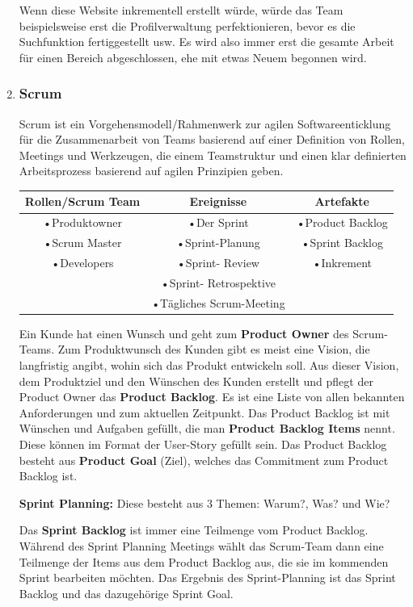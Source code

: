 \documentclass{article}
\begin{document}
\begin{enumerate}[label=\alph*)]
Wenn diese Website inkrementell erstellt würde, würde das Team beispielsweise erst die Profilverwaltung perfektionieren, bevor es die Suchfunktion fertiggestellt usw. Es wird also immer erst die gesamte Arbeit für einen Bereich abgeschlossen, ehe mit etwas Neuem begonnen wird.
	

	\item \subsubsection*{Scrum}
	Scrum ist ein Vorgehensmodell/Rahmenwerk zur agilen Softwareenticklung für die Zusammenarbeit von Teams basierend auf einer Definition von Rollen, Meetings und Werkzeugen, die einem Teamstruktur und einen klar definierten Arbeitsprozess basierend auf agilen Prinzipien geben.
	
	\begin{table}[ht]
	\begin{tabular}{|c|c|c|}
 	\hline
	 Rollen/Scrum Team & Ereignisse & Artefakte \\
	 \hline
 	 •Produktowner & •Der Sprint & •Product Backlog\\
 	 •Scrum Master & •Sprint-Planung & •Sprint Backlog\\
 	 •Developers & •Sprint- Review & •Inkrement\\
 	 & •Sprint- Retrospektive & \\
 	 & •Tägliches Scrum-Meeting &\\
	 \hline
\end{tabular}
\end{table}
    Ein Kunde hat einen Wunsch und geht zum \textbf{Product Owner} des Scrum-Teams. Zum Produktwunsch des Kunden gibt es meist eine Vision, die langfristig angibt, wohin sich das Produkt entwickeln soll. Aus dieser Vision, dem Produktziel und den Wünschen des Kunden erstellt und pflegt der Product Owner das \textbf{Product Backlog}. Es ist eine Liste von allen bekannten Anforderungen und zum aktuellen Zeitpunkt. Das Product Backlog ist mit Wünschen und Aufgaben gefüllt, die man \textbf{Product Backlog Items} nennt. Diese können im Format der User-Story gefüllt sein. Das Product Backlog besteht aus \textbf{Product Goal} (Ziel), welches das Commitment zum Product Backlog ist.

\textbf{Sprint Planning:} Diese besteht aus 3 Themen: Warum?, Was? und Wie?

Das \textbf{Sprint Backlog} ist immer eine Teilmenge vom Product Backlog. Während des Sprint Planning Meetings wählt das Scrum-Team dann eine Teilmenge der Items aus dem Product Backlog aus, die sie im kommenden Sprint bearbeiten möchten. Das Ergebnis des Sprint-Planning ist das Sprint Backlog und das dazugehörige Sprint Goal. 


\end{enumerate}
\end{document}
